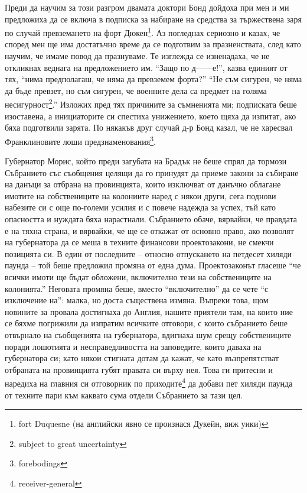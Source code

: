 \documentclass[12pt]{book}
\begin{document}
Преди да научим за този разгром двамата доктори Бонд дойдоха при мен и ми предложиха да се включа в подписка за набиране на средства за тържествена заря по случай превземането на форт Дюкен\footnote{fort Duquesne (на английски явно се произнася Дукейн, виж уики)}. Аз погледнах сериозно и казах, че според мен ще има достатъчно време да се подготвим за празненствата, след като научим, че имаме повод да празнуваме. Те изглежда се изненадаха, че не откликнах веднага на предложението им. “Защо по д------е!”, казва единият от тях, “нима предполагаш, че няма да превземем форта?” “Не съм сигурен, че няма да бъде превзет, но съм сигурен, че военните дела са предмет на голяма несигурност\footnote{subject to great uncertainty}.” Изложих пред тях причините за съмненията ми; подписката беше изоставена, а инициаторите си спестиха унижението, което щяха да изпитат, ако бяха подготвили зарята. По някакъв друг случай д-р Бонд казал, че не харесвал Франклиновите лоши предзнаменования\footnote{forebodings}. 

Губернатор Морис, който преди загубата на Брадък не беше спрял да тормози Събранието със съобщения целящи да го принудят да приеме закони за събиране на данъци за отбрана на провинцията, които изключват от данъчно облагане имотите на собствениците на колониите наред с някои други, сега поднови набезите си с още по-големи усилия и с повече надежда за успех, тъй като опасността и нуждата бяха нарастнали. Събранието обаче, вярвайки, че правдата е на тяхна страна, и вярвайки, че ще се откажат от основно право, ако позволят на губернатора да се меша в техните финансови проектозакони, не смекчи позицията си. В един от последните – относно отпускането на петдесет хиляди паунда – той беше предложил промяна от една дума. Проектозаконът гласеше “че всички имоти ще бъдат обложени, включително тези на собствениците на колонията.” Неговата промяна беше, вместо “включително” да се чете “с изключение на”: малка, но доста съществена измяна. Въпреки това, щом новините за провала достигнаха до Англия, нашите приятели там, на които ние се бяхме погрижили да изпратим всичките отговори, с които събранието беше отвърнало на съобщенията на губернатора, вдигнаха шум срещу собствениците поради лошотията и несправедливостта на заповедите, които даваха на губернатора си; като някои стигната дотам да кажат, че като възпрепятстват отбраната на провинцията губят правата си върху нея. Това ги притесни и наредиха на главния си отговорник по приходите\footnote{receiver-general} да добави пет хиляди паунда от техните пари към каквато сума отдели Събранието за тази цел.
\end{document}
